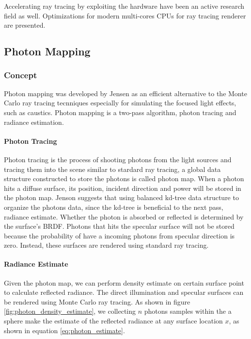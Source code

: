 Accelerating ray tracing by exploiting the hardware have been an active research field as well. Optimizations for modern multi-cores CPUs for ray tracing renderer are presented\cite{Wald:2002:IGI:581896.581899}. 

\subsection{Photon Mapping}


\subsubsection{Concept} 

Photon mapping was developed by Jensen \cite{HenrikWannJensen2004} as an efficient alternative to the Monte Carlo ray tracing tecnniques especially for simulating the focused light effects, such as caustics. Photon mapping is a two-pass algorithm, photon tracing and radiance estimation. 

\paragraph{Photon Tracing} 
Photon tracing is the process of shooting photons from the light sources and tracing them into the scene similar to stardard ray tracing, a global data structure constructed to store the photons is called photon map. When a photon hits a diffuse surface, its position, incident direction and power will be stored in the photon map. Jenson suggests that using balanced kd-tree data structure to organize the photons data, since the kd-tree is beneficial to the next pass, radiance estimate. Whether the photon is absorbed or reflected is determined by the surface's BRDF. Photons that hits the specular surface will not be stored because the probability of have a incoming photons from specular direction is zero. Instead, these surfaces are rendered using standard ray tracing. 

\paragraph{Radiance Estimate}
Given the photon map, we can perform density estimate on certain surface point to calculate reflected radiance. The direct illumination and specular surfaces can be rendered using Monte Carlo ray tracing. As shown in figure \ref{fig:photon_density_estimate}, we collecting \(n\) photons samples within the a sphere make the estimate of the reflected radiance at any surface location \(x\), as shown in equation \ref{eq:photon_estimate}. 

